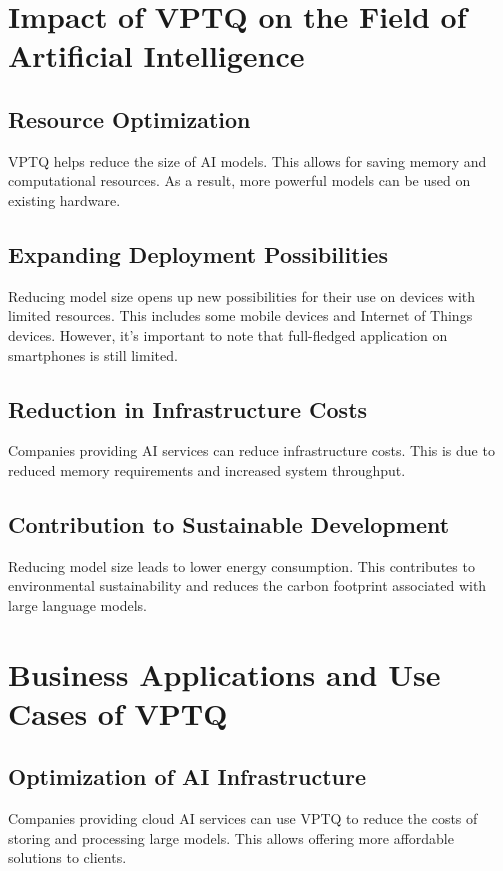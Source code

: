 \documentclass{article}
\begin{document}
\section{Impact of VPTQ on the Field of Artificial Intelligence}

\subsection{Resource Optimization}
VPTQ helps reduce the size of AI models. This allows for saving memory and computational resources. As a result, more powerful models can be used on existing hardware.

\subsection{Expanding Deployment Possibilities}
Reducing model size opens up new possibilities for their use on devices with limited resources. This includes some mobile devices and Internet of Things devices. However, it's important to note that full-fledged application on smartphones is still limited.

\subsection{Reduction in Infrastructure Costs}
Companies providing AI services can reduce infrastructure costs. This is due to reduced memory requirements and increased system throughput.

\subsection{Contribution to Sustainable Development}
Reducing model size leads to lower energy consumption. This contributes to environmental sustainability and reduces the carbon footprint associated with large language models.

\section{Business Applications and Use Cases of VPTQ}

\subsection{Optimization of AI Infrastructure}
Companies providing cloud AI services can use VPTQ to reduce the costs of storing and processing large models. This allows offering more affordable solutions to clients.
\end{document}
